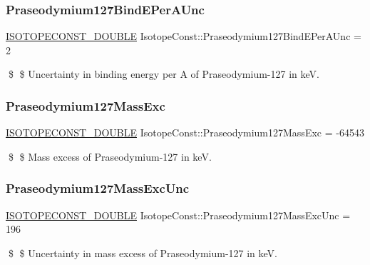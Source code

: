 \subsubsection{\texorpdfstring{Praseodymium127\+Bind\+E\+Per\+A\+Unc}{Praseodymium127BindEPerAUnc}}
{\footnotesize\ttfamily \mbox{\hyperlink{group___isotope_const-_macros_ga8f45a7272ce02c0b4c65c44636ed719a}{I\+S\+O\+T\+O\+P\+E\+C\+O\+N\+S\+T\+\_\+\+D\+O\+U\+B\+LE}} Isotope\+Const\+::\+Praseodymium127\+Bind\+E\+Per\+A\+Unc = 2}

\$ \$ Uncertainty in binding energy per A of Praseodymium-\/127 in keV. \mbox{\label{group___isotope_const-_praseodymium-_pr127_gaae4ebf5cb725b12d731b230e021e9f6f}} 
\subsubsection{\texorpdfstring{Praseodymium127\+Mass\+Exc}{Praseodymium127MassExc}}
{\footnotesize\ttfamily \mbox{\hyperlink{group___isotope_const-_macros_ga8f45a7272ce02c0b4c65c44636ed719a}{I\+S\+O\+T\+O\+P\+E\+C\+O\+N\+S\+T\+\_\+\+D\+O\+U\+B\+LE}} Isotope\+Const\+::\+Praseodymium127\+Mass\+Exc = -\/64543}

\$ \$ Mass excess of Praseodymium-\/127 in keV. \mbox{\label{group___isotope_const-_praseodymium-_pr127_gac053202ad09dcb02b367a3f9c264f5ff}} 
\subsubsection{\texorpdfstring{Praseodymium127\+Mass\+Exc\+Unc}{Praseodymium127MassExcUnc}}
{\footnotesize\ttfamily \mbox{\hyperlink{group___isotope_const-_macros_ga8f45a7272ce02c0b4c65c44636ed719a}{I\+S\+O\+T\+O\+P\+E\+C\+O\+N\+S\+T\+\_\+\+D\+O\+U\+B\+LE}} Isotope\+Const\+::\+Praseodymium127\+Mass\+Exc\+Unc = 196}

\$ \$ Uncertainty in mass excess of Praseodymium-\/127 in keV. \mbox{\label{group___isotope_const-_praseodymium-_pr127_gaa52cc8b89d63920e46ced1e99b910a89}} 
